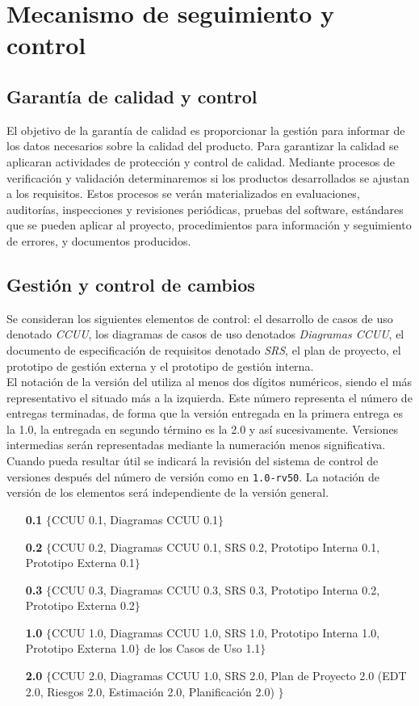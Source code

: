 \documentclass[11pt, a4paper, twoside]{report}
\begin{document}
	\section{Mecanismo de seguimiento y control}
		\subsection{Garantía de calidad y control}
		El objetivo de la garantía de calidad es proporcionar la gestión para informar de los datos necesarios sobre la calidad del producto. Para garantizar la calidad se aplicaran actividades de protección y control de calidad. Mediante procesos de verificación y validación determinaremos si los productos desarrollados se ajustan a los requisitos. Estos procesos se verán materializados en evaluaciones, auditorías, inspecciones y revisiones periódicas, pruebas del software, estándares que se pueden aplicar al proyecto, procedimientos para información y seguimiento de errores, y documentos producidos.
		\subsection{Gestión y control de cambios}
			Se consideran los siguientes elementos de control: el desarrollo de casos de uso denotado \textit{CCUU}, los diagramas de casos de uso denotados \textit{Diagramas CCUU}, el documento de especificación de requisitos \software denotado \textit{SRS}, el plan de proyecto, el prototipo de gestión externa y el prototipo de gestión interna.\\

			El notación de la versión del \software utiliza al menos dos dígitos numéricos, siendo el más representativo el situado más a la izquierda. Este número representa el número de entregas terminadas, de forma que la versión entregada en la primera entrega es la 1.0, la entregada en segundo término es la 2.0 y así sucesivamente. Versiones intermedias serán representadas mediante la numeración menos significativa. Cuando pueda resultar útil se indicará la revisión del sistema de control de versiones después del número de versión como en \verb|1.0-rv50|. La notación de versión de los elementos será independiente de la versión general.
		
		\begin{itemize}
			\item[\bfseries 0.1] $\{$CCUU 0.1, Diagramas CCUU 0.1$\}$
			\item[\bfseries 0.2] $\{$CCUU 0.2, Diagramas CCUU 0.1, SRS 0.2, Prototipo Interna 0.1, Prototipo Externa 0.1$\}$
			\item[\bfseries 0.3] $\{$CCUU 0.3, Diagramas CCUU 0.3, SRS 0.3, Prototipo Interna 0.2, Prototipo Externa 0.2$\}$
			\item[\bfseries 1.0] $\{$CCUU 1.0, Diagramas CCUU 1.0, SRS 1.0, Prototipo Interna 1.0, Prototipo Externa 1.0$\}$ de los Casos de Uso 1.1$\}$
			\item[\bfseries 2.0] $\{$CCUU 2.0, Diagramas CCUU 1.0, SRS 2.0, Plan de Proyecto 2.0 (EDT 2.0, Riesgos 2.0, Estimación 2.0, Planificación 2.0) $\}$
		\end{itemize}
		
\end{document}
